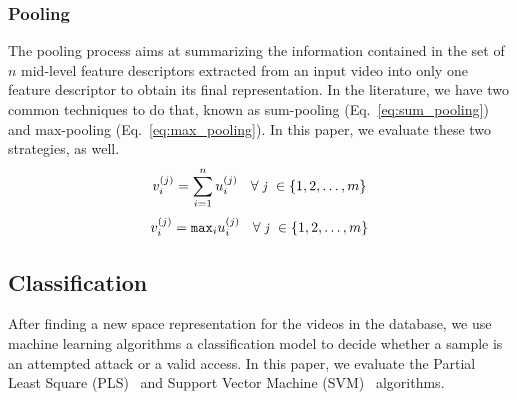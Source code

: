 \subsubsection{Pooling}
The pooling process aims at summarizing the information contained in the set of $n$ mid-level feature descriptors extracted from an input video into only one feature descriptor to obtain its final representation. In the literature, we have two common techniques to do that, known as sum-pooling (Eq.~\ref{eq:sum_pooling}) and max-pooling (Eq.~\ref{eq:max_pooling}). In this paper, we evaluate these two strategies, as well.
%
\begin{eqnarray}
\begin{small}
	v_{i}^{(j)} = \sum_{i=1}^{n}{u_{i}^{(j)}} \quad \forall \textrm{ \textit{j} } \in \{1, 2, \ldots, m\}
\label{eq:sum_pooling}
\end{small}
\end{eqnarray}
%
\begin{eqnarray}
\begin{small}
	v_{i}^{(j)} = \mathtt{max}_{i} u_{i}^{(j)} \quad \forall \textrm{ \textit{j} } \in \{1, 2, \ldots, m\}
\label{eq:max_pooling}
\end{small}
\end{eqnarray}

\subsection{Classification}
After finding a new space representation for the videos in the database, we use machine learning algorithms  a classification model to decide whether a sample is an attempted attack or a valid access. In this paper, we evaluate the Partial Least Square (PLS)~\cite{Hoskuldsson:JC:1988} and Support Vector Machine (SVM)~\cite{Cortes:ML:1995} algorithms. 

